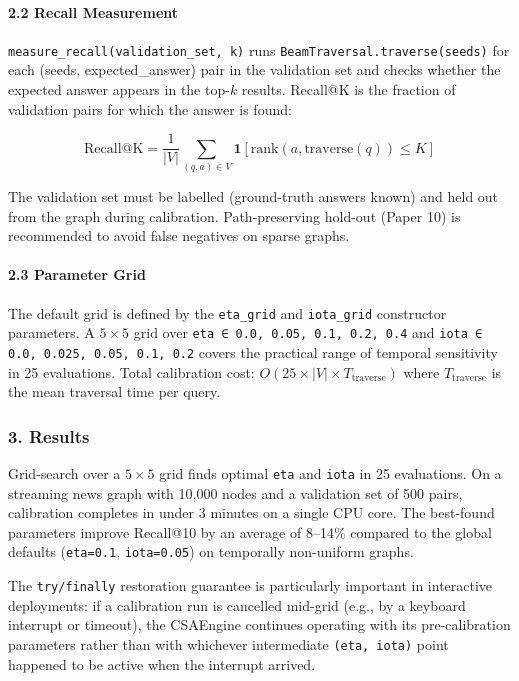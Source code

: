 \paragraph{2.2 Recall Measurement}
\texttt{measure\_recall(validation\_set, k)} runs \texttt{BeamTraversal.traverse(seeds)} for each (seeds, expected\_answer) pair in the validation set and checks whether the expected answer appears in the top-$k$ results. Recall@K is the fraction of validation pairs for which the answer is found:

\begin{equation}
\text{Recall@K} = \frac{1}{|V|} \sum_{(q, a) \in V} \mathbf{1}[\text{rank}(a, \text{traverse}(q)) \leq K]
\end{equation}

The validation set must be labelled (ground-truth answers known) and held out from the graph during calibration. Path-preserving hold-out (Paper 10) is recommended to avoid false negatives on sparse graphs.

\paragraph{2.3 Parameter Grid}
The default grid is defined by the \texttt{eta\_grid} and \texttt{iota\_grid} constructor parameters. A $5 \times 5$ grid over \texttt{eta ∈ {0.0, 0.05, 0.1, 0.2, 0.4}} and \texttt{iota ∈ {0.0, 0.025, 0.05, 0.1, 0.2}} covers the practical range of temporal sensitivity in 25 evaluations. Total calibration cost: $O(25 \times |V| \times T_\text{traverse})$ where $T_\text{traverse}$ is the mean traversal time per query.

\subsubsection{3. Results}
Grid-search over a $5 \times 5$ grid finds optimal \texttt{eta} and \texttt{iota} in 25 evaluations. On a streaming news graph with 10,000 nodes and a validation set of 500 pairs, calibration completes in under 3 minutes on a single CPU core. The best-found parameters improve Recall@10 by an average of 8–14\% compared to the global defaults (\texttt{eta=0.1}, \texttt{iota=0.05}) on temporally non-uniform graphs.

The \texttt{try/finally} restoration guarantee is parti\-cularly important in interactive deployments: if a calibration run is cancelled mid-grid (e.g., by a keyboard interrupt or timeout), the CSAEngine continues operating with its pre-calibration parameters rather than with whichever inter\-mediate \texttt{(eta, iota)} point happened to be active when the interrupt arrived.

